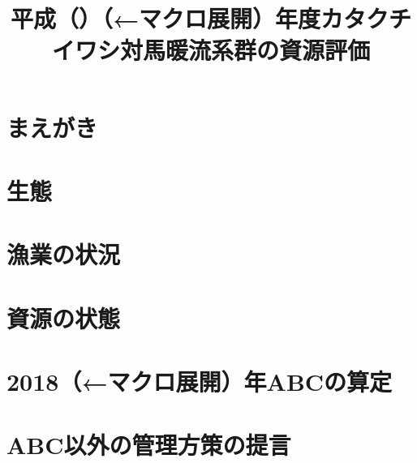 \documentclass{jsarticle}
\title{平成\ThisYrJP（\ThisYr）（←マクロ展開）年度カタクチイワシ対馬暖流系群の資源評価}
\author{}
\date{}
\newcommand{\ThisYr}{2018}
\begin{document}
\maketitle
\section{まえがき}
\section{生態}
\section{漁業の状況}
\section{資源の状態}
\section{\ThisYr （←マクロ展開）年ABCの算定}
\section{ABC以外の管理方策の提言}
\end{document}
